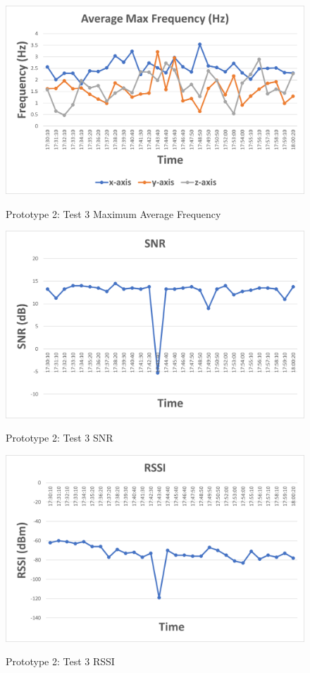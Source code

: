 \begin{figure}[H]
	\centering
	\caption{Prototype 2: Test 3 Maximum Average Frequency}
	\includegraphics[width=\textwidth]{Sections/Prototype-Testing/proto2-test3-f.png}
	\label{proto2-test3-f}
\end{figure}

\begin{figure}[H]
	\centering
	\caption{Prototype 2: Test 3 SNR}
	\includegraphics[width=\textwidth]{Sections/Prototype-Testing/proto2-test3-snr.png}
	\label{proto2-test3-snr}
\end{figure}

\begin{figure}[H]
	\centering
	\caption{Prototype 2: Test 3 RSSI}
	\includegraphics[width=\textwidth]{Sections/Prototype-Testing/proto2-test3-rssi.png}
	\label{proto2-test3-rssi}
\end{figure}










